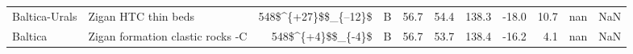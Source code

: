 \begin{longtable}{p{1 in}p{1 in}rrrrrrrr}
                 Baltica-Urals &                                Zigan HTC thin beds &   548\$\textasciicircum \{+27\}\$\$\_\{--12\}\$ &      B &      56.7 &      54.4 & 138.3 & -18.0 &      10.7 &         nan &                                                NaN \\
                       Baltica &                   Zigan formation clastic rocks -C &      548\$\textasciicircum \{+4\}\$\$\_\{-4\}\$ &      B &      56.7 &      53.7 & 138.4 & -16.2 &       4.1 &         nan &                                                NaN \\
\end{longtable}
